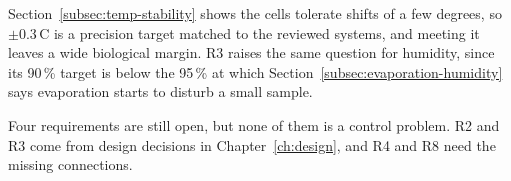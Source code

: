 Section~\ref{subsec:temp-stability} shows the cells tolerate shifts of a few degrees, so $\pm$0.3\,\textdegree{}C is a precision target matched to the reviewed systems, and meeting it leaves a wide biological margin. R3 raises the same question for humidity, since its 90\,\% target is below the 95\,\% at which Section~\ref{subsec:evaporation-humidity} says evaporation starts to disturb a small sample.

Four requirements are still open, but none of them is a control problem. R2 and R3 come from design decisions in Chapter~\ref{ch:design}, and R4 and R8 need the missing connections.